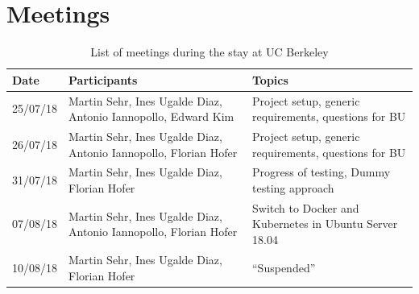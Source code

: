 \documentclass[]{scrartcl}
\begin{document}
\section{Meetings}
\label{sec:meeting}

\begin{table}[H]
	\centering
	\caption{List of meetings during the stay at UC Berkeley}
	
	\begin{tabular}{l p{5cm} p{5cm}}
	Date & Participants & Topics \\
	\hline
	25/07/18 & Martin Sehr, Ines Ugalde Diaz, Antonio Iannopollo, Edward Kim & Project setup, generic requirements, questions for BU\\
	26/07/18 & Martin Sehr, Ines Ugalde Diaz, Antonio Iannopollo, Florian Hofer & Project setup, generic requirements, questions for BU\\
	31/07/18 & Martin Sehr, Ines Ugalde Diaz, Florian Hofer & Progress of testing, Dummy testing approach\\
	07/08/18 & Martin Sehr, Ines Ugalde Diaz, Antonio Iannopollo, Florian Hofer & Switch to Docker and Kubernetes in Ubuntu Server 18.04\\
	10/08/18 & Martin Sehr, Ines Ugalde Diaz, Florian Hofer & ``Suspended''\\
	\hline
	\end{tabular}
	
	\label{tab:meeting}
\end{table}



\end{document}
